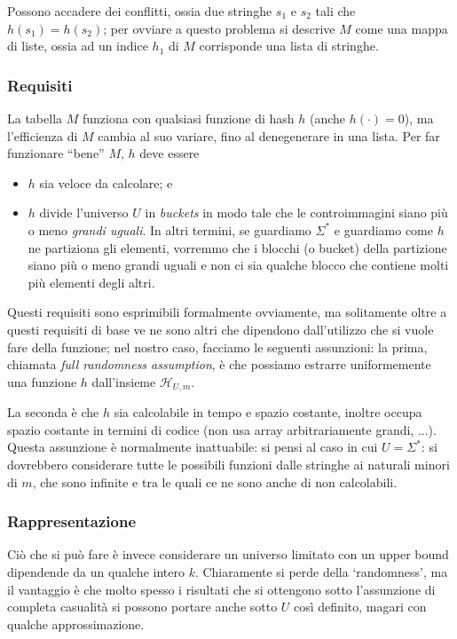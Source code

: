 Possono accadere dei conflitti, ossia due stringhe $s_1$ e $s_2$ tali che
$h(s_1) = h(s_2)$; per ovviare a questo problema si descrive $M$ come una mappa di liste, ossia
ad un indice $h_1$ di $M$ corrisponde una lista di stringhe.

\subsubsection{Requisiti}
La tabella $M$ funziona con qualsiasi funzione di hash $h$ (anche $h(\cdot) = 0$),
ma l'efficienza di $M$ cambia al suo variare, fino al denegenerare in una lista.
Per far funzionare ``bene'' $M$, $h$ deve essere
\begin{itemize}
	\setlength\itemsep{0pt}
	\item $h$ sia veloce da calcolare; e
	\item $h$ divide l'universo $U$ in \textit{buckets} in modo tale che le
	      controimmagini siano più o meno \textit{grandi uguali}.
	      In altri termini, se guardiamo $\Sigma^*$ e guardiamo come
	      $h$ ne partiziona gli elementi, vorremmo che i blocchi (o bucket)
	      della partizione siano più o meno grandi uguali e non ci sia
	      qualche blocco che contiene molti più elementi degli
	      altri.
\end{itemize}
Questi requisiti sono esprimibili formalmente ovviamente, ma solitamente oltre
a questi requisiti di base ve ne sono altri che dipendono dall'utilizzo
che si vuole fare della funzione; nel nostro caso, facciamo le seguenti
assunzioni: la prima, chiamata \textit{full randomness assumption},
è che possiamo estrarre uniformemente una funzione $h$ dall'insieme $\mathcal{H}_{U,m}$.

La seconda è che $h$ sia calcolabile in tempo e spazio costante, inoltre occupa
spazio costante in termini di codice (non usa array arbitrariamente grandi, ...).
Questa assunzione è normalmente inattuabile: si pensi al caso in cui $U = \Sigma^*$:
si dovrebbero considerare tutte le possibili funzioni dalle stringhe ai naturali
minori di $m$, che sono infinite e tra le quali ce ne sono anche di non calcolabili.

\subsubsection{Rappresentazione}
Ciò che si può fare è invece considerare un universo limitato con un
upper bound dipendende da un qualche intero $k$.
Chiaramente si perde della `randomness', ma il vantaggio è che molto spesso
i risultati che si ottengono sotto l'assunzione di completa casualità si possono
portare anche sotto $U$ così definito, magari con qualche approssimazione.

